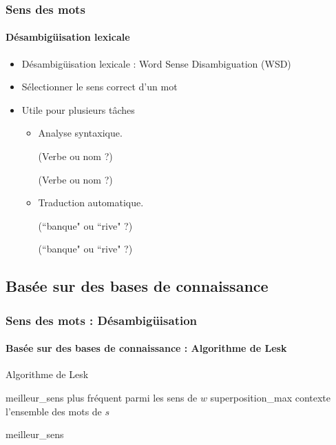 \documentclass[xcolor=table]{beamer}
\begin{document}
\begin{frame}
\frametitle{Sens des mots}
\framesubtitle{Désambigüisation lexicale}

\begin{itemize}
	\item Désambigüisation lexicale : Word Sense Disambiguation (WSD)
	\item Sélectionner le sens correct d'un mot 
	\item Utile pour plusieurs tâches 
	\begin{itemize}
		\item Analyse syntaxique. 
		
		 (Verbe ou nom ?)
		
		 (Verbe ou nom ?)
		
		\item Traduction automatique. 
		
		 (``banque" ou ``rive" ?)
		
		 (``banque" ou ``rive" ?)
	\end{itemize}
\end{itemize}

\end{frame}

\subsection{Basée sur des bases de connaissance}

\begin{frame}
\frametitle{Sens des mots : Désambigüisation}
\framesubtitle{Basée sur des bases de connaissance : Algorithme de Lesk}

\vspace{-6pt}
\begin{block}{Algorithme de Lesk}
	\footnotesize\vspace{-3pt}
	\begin{algorithm}[H]
		
		meilleur\_sens \textleftarrow plus fréquent parmi les sens de $w$\;
		superposition\_max \;
		contexte \textleftarrow l'ensemble des mots de $s$\; 
		
		
		\Retour meilleur\_sens \;
		\vspace{-3pt}
	\end{algorithm}
\end{block}

\end{frame}
\end{document}
